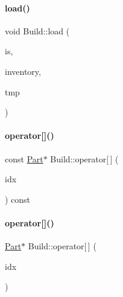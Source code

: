 \paragraph{\texorpdfstring{load()}{load()}}
{\footnotesize\ttfamily void Build\+::load (\begin{DoxyParamCaption}\item[{std\+::fstream \&}]{is,  }\item[{\mbox{\hyperlink{class_inventory}{Inventory}} \&}]{inventory,  }\item[{\mbox{\hyperlink{struct_temp_input}{Temp\+Input}} \&}]{tmp }\end{DoxyParamCaption})}

\mbox{\label{class_build_af3e03ed173016d7ff348d1e7057bd97c}} 
\paragraph{\texorpdfstring{operator[]()}{operator[]()}\hspace{0.1cm}{\footnotesize\ttfamily [1/2]}}
{\footnotesize\ttfamily const \mbox{\hyperlink{class_part}{Part}}$\ast$ Build\+::operator\mbox{[}$\,$\mbox{]} (\begin{DoxyParamCaption}\item[{int}]{idx }\end{DoxyParamCaption}) const\hspace{0.3cm}{\ttfamily [inline]}}

\mbox{\label{class_build_aa48e871d88c60272ab5f6cd5b97aaad0}} 
\paragraph{\texorpdfstring{operator[]()}{operator[]()}\hspace{0.1cm}{\footnotesize\ttfamily [2/2]}}
{\footnotesize\ttfamily \mbox{\hyperlink{class_part}{Part}}$\ast$ Build\+::operator\mbox{[}$\,$\mbox{]} (\begin{DoxyParamCaption}\item[{int}]{idx }\end{DoxyParamCaption})\hspace{0.3cm}{\ttfamily [inline]}}

\mbox{\label{class_build_adb328444dd8bf97b36356be36db01194}} 
